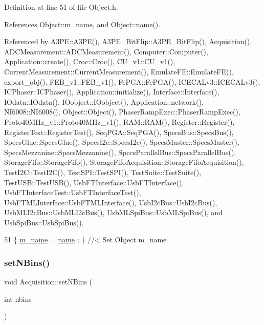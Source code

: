 Definition at line 51 of file Object.\+h.



References Object\+::m\+\_\+name, and Object\+::name().



Referenced by A3\+P\+E\+::\+A3\+P\+E(), A3\+P\+E\+\_\+\+Bit\+Flip\+::\+A3\+P\+E\+\_\+\+Bit\+Flip(), Acquisition(), A\+D\+C\+Measurement\+::\+A\+D\+C\+Measurement(), Computer\+::\+Computer(), Application\+::create(), Croc\+::\+Croc(), C\+U\+\_\+v1\+::\+C\+U\+\_\+v1(), Current\+Measurement\+::\+Current\+Measurement(), Emulate\+F\+E\+::\+Emulate\+F\+E(), export\+\_\+obj(), F\+E\+B\+\_\+v1\+::\+F\+E\+B\+\_\+v1(), Fe\+P\+G\+A\+::\+Fe\+P\+G\+A(), I\+C\+E\+C\+A\+Lv3\+::\+I\+C\+E\+C\+A\+Lv3(), I\+C\+Phaser\+::\+I\+C\+Phaser(), Application\+::initialize(), Interface\+::\+Interface(), I\+Odata\+::\+I\+Odata(), I\+Oobject\+::\+I\+Oobject(), Application\+::network(), N\+I6008\+::\+N\+I6008(), Object\+::\+Object(), Phaser\+Ramp\+Exec\+::\+Phaser\+Ramp\+Exec(), Proto40\+M\+Hz\+\_\+v1\+::\+Proto40\+M\+Hz\+\_\+v1(), R\+A\+M\+::\+R\+A\+M(), Register\+::\+Register(), Register\+Test\+::\+Register\+Test(), Seq\+P\+G\+A\+::\+Seq\+P\+G\+A(), Specs\+Bus\+::\+Specs\+Bus(), Specs\+Glue\+::\+Specs\+Glue(), Specs\+I2c\+::\+Specs\+I2c(), Specs\+Master\+::\+Specs\+Master(), Specs\+Mezzanine\+::\+Specs\+Mezzanine(), Specs\+Parallel\+Bus\+::\+Specs\+Parallel\+Bus(), Storage\+Fifo\+::\+Storage\+Fifo(), Storage\+Fifo\+Acquisition\+::\+Storage\+Fifo\+Acquisition(), Test\+I2\+C\+::\+Test\+I2\+C(), Test\+S\+P\+I\+::\+Test\+S\+P\+I(), Test\+Suite\+::\+Test\+Suite(), Test\+U\+S\+B\+::\+Test\+U\+S\+B(), Usb\+F\+T\+Interface\+::\+Usb\+F\+T\+Interface(), Usb\+F\+T\+Interface\+Test\+::\+Usb\+F\+T\+Interface\+Test(), Usb\+F\+T\+M\+L\+Interface\+::\+Usb\+F\+T\+M\+L\+Interface(), Usb\+I2c\+Bus\+::\+Usb\+I2c\+Bus(), Usb\+M\+L\+I2c\+Bus\+::\+Usb\+M\+L\+I2c\+Bus(), Usb\+M\+L\+Spi\+Bus\+::\+Usb\+M\+L\+Spi\+Bus(), and Usb\+Spi\+Bus\+::\+Usb\+Spi\+Bus().


\begin{DoxyCode}
51 \{ \hyperlink{classObject_a8b83c95c705d2c3ba0d081fe1710f48d}{m\_name}  = \hyperlink{classObject_a300f4c05dd468c7bb8b3c968868443c1}{name}  ; \} \textcolor{comment}{//< Set Object m\_name}
\end{DoxyCode}
\mbox{\label{classAcquisition_a6ee040a009aa48f848b1e12434135db9}} 
\subsubsection{\texorpdfstring{set\+N\+Bins()}{setNBins()}\hspace{0.1cm}{\footnotesize\ttfamily [1/2]}}
{\footnotesize\ttfamily void Acquisition\+::set\+N\+Bins (\begin{DoxyParamCaption}\item[{int}]{nbins }\end{DoxyParamCaption})\hspace{0.3cm}{\ttfamily [inline]}}



